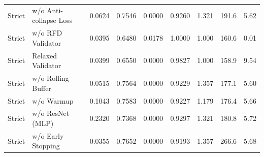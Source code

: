 \begin{tabular}{lllllllll}
Strict & w/o Anti-collapse Loss & 0.0624 & 0.7546 & 0.0000 & 0.9260 & 1.321 & 191.6 & 5.62 \\
Strict & w/o RFD Validator & 0.0395 & 0.6480 & 0.0178 & 1.0000 & 1.000 & 160.6 & 0.01 \\
Strict & Relaxed Validator & 0.0399 & 0.6550 & 0.0000 & 0.9827 & 1.000 & 158.9 & 9.54 \\
Strict & w/o Rolling Buffer & 0.0515 & 0.7564 & 0.0000 & 0.9229 & 1.357 & 177.1 & 5.60 \\
Strict & w/o Warmup & 0.1043 & 0.7583 & 0.0000 & 0.9227 & 1.179 & 176.4 & 5.66 \\
Strict & w/o ResNet (MLP) & 0.2320 & 0.7368 & 0.0000 & 0.9297 & 1.321 & 180.8 & 5.72 \\
Strict & w/o Early Stopping & 0.0355 & 0.7652 & 0.0000 & 0.9193 & 1.357 & 266.6 & 5.68 \\
\bottomrule
\end{tabular}

